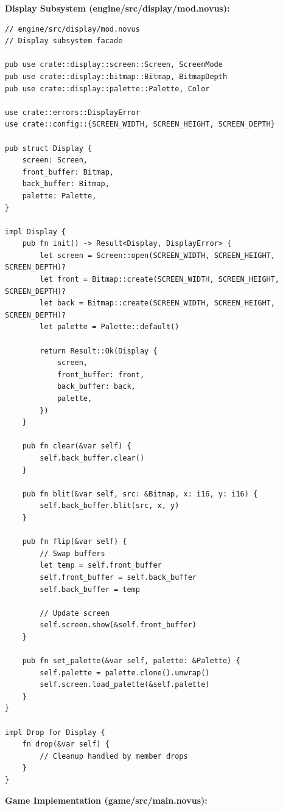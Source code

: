 \textbf{Display Subsystem (engine/src/display/mod.novus):}

\begin{lstlisting}
// engine/src/display/mod.novus
// Display subsystem facade

pub use crate::display::screen::Screen, ScreenMode
pub use crate::display::bitmap::Bitmap, BitmapDepth
pub use crate::display::palette::Palette, Color

use crate::errors::DisplayError
use crate::config::{SCREEN_WIDTH, SCREEN_HEIGHT, SCREEN_DEPTH}

pub struct Display {
    screen: Screen,
    front_buffer: Bitmap,
    back_buffer: Bitmap,
    palette: Palette,
}

impl Display {
    pub fn init() -> Result<Display, DisplayError> {
        let screen = Screen::open(SCREEN_WIDTH, SCREEN_HEIGHT, SCREEN_DEPTH)?
        let front = Bitmap::create(SCREEN_WIDTH, SCREEN_HEIGHT, SCREEN_DEPTH)?
        let back = Bitmap::create(SCREEN_WIDTH, SCREEN_HEIGHT, SCREEN_DEPTH)?
        let palette = Palette::default()

        return Result::Ok(Display {
            screen,
            front_buffer: front,
            back_buffer: back,
            palette,
        })
    }

    pub fn clear(&var self) {
        self.back_buffer.clear()
    }

    pub fn blit(&var self, src: &Bitmap, x: i16, y: i16) {
        self.back_buffer.blit(src, x, y)
    }

    pub fn flip(&var self) {
        // Swap buffers
        let temp = self.front_buffer
        self.front_buffer = self.back_buffer
        self.back_buffer = temp

        // Update screen
        self.screen.show(&self.front_buffer)
    }

    pub fn set_palette(&var self, palette: &Palette) {
        self.palette = palette.clone().unwrap()
        self.screen.load_palette(&self.palette)
    }
}

impl Drop for Display {
    fn drop(&var self) {
        // Cleanup handled by member drops
    }
}
\end{lstlisting}

\textbf{Game Implementation (game/src/main.novus):}

